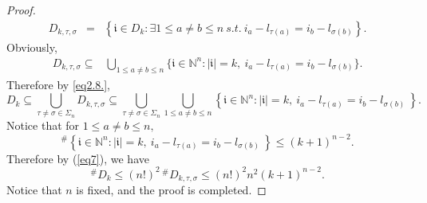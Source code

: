 \documentclass[10pt,a4paper]{amsart}
\begin{document}
\begin{proof}
	\begin{eqnarray*}\label{eq2.7.11}
		D_{k,\tau ,\sigma}&=&\left \{   \mathfrak{i} \in D_{k}: \exists 1\leq a \neq b\leq n ~s.t.~ i_{a}-l_{\tau  (a)} =i_{b}-l_{\sigma  (b)}\right\}.
\end{eqnarray*}
Obviously,
\begin{eqnarray*}
 D_{k,\tau ,\sigma}\subseteq& \bigcup\limits_{1 \le a \ne b \le n} \{\mathfrak{i} \in \mathbb{N}^n: |\mathfrak{i}|=k, \ i_{a}-l_{\tau  (a)} =i_{b}-l_{\sigma  (b)} \}.
	\end{eqnarray*}
	Therefore by \eqref{eq2.8.},
	\begin{equation}\label{eq7}
		D_{k} \subseteq \bigcup\limits_{\tau \ne \sigma \in \Sigma_{n}}	D_{k,\tau ,\sigma} \subseteq \bigcup\limits_{\tau \ne \sigma \in \Sigma_{n}} \bigcup\limits_{1 \le a \ne b \le n}\left \{\mathfrak{i} \in \mathbb{N}^n: |\mathfrak{i}|=k, \ i_{a}-l_{\tau  (a)} =i_{b}-l_{\sigma  (b)}   \   \right \}.
	\end{equation}
	Notice that for $1 \le a \ne b \le n,$
 $$
 ^{\#  } \left \{\mathfrak{i}\in \mathbb{N}^n: |\mathfrak{i}|=k, \ i_{a}-l_{\tau  (a)} =i_{b}-l_{\sigma  (b)}   \   \right \}  \le \left ( k+1 \right ) ^{n-2}.
 $$ 
 Therefore by (\ref{eq7}), we have 
$$^{\#  } D_{k}  \leq (n!)^{2}\,^{\#  } D_{k,\tau ,\sigma} \le (n!)^{2}n^{2}\left ( k+1 \right ) ^{n-2}.$$
	Notice that $n$ is fixed, and the proof is completed.
\end{proof}
\end{document}

